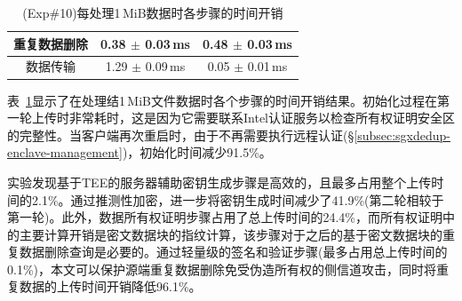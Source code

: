 \begin{table}[!htb]
\begin{tabular}{|c|c|c|c|}
    \multicolumn{2}{|c|}{重复数据删除}            & \multicolumn{1}{c|}{0.38 $\pm$ 0.03\,ms }                         & 0.48 $\pm$ 0.03\,ms                           \\ \hline
    \multicolumn{2}{|c|}{数据传输}                & \multicolumn{1}{c|}{1.29 $\pm$ 0.09\,ms }                         & 0.05 $\pm$ 0.01\,ms                           \\ \hline
  \end{tabular}
  \caption{(Exp\#10)每处理1\,MiB数据时各步骤的时间开销}
  \label{tab:sgxdedup-system-breakdown}
\end{table}

表~\ref{tab:sgxdedup-system-breakdown}显示了在处理结1\,MiB文件数据时各个步骤的时间开销结果。初始化过程在第一轮上传时非常耗时，这是因为它需要联系Intel认证服务以检查所有权证明安全区的完整性。当客户端再次重启时，由于不再需要执行远程认证(\S\ref{subsec:sgxdedup-enclave-management})，初始化时间减少91.5\%。

实验发现基于TEE的服务器辅助密钥生成步骤是高效的，且最多占用整个上传时间的2.1\%。通过推测性加密，\sysnameS 进一步将密钥生成时间减少了41.9\%(第二轮相较于第一轮)。此外，数据所有权证明步骤占用了总上传时间的24.4\%，而所有权证明中的主要计算开销是密文数据块的指纹计算，该步骤对于之后的基于密文数据块的重复数据删除查询是必要的。通过轻量级的签名和验证步骤(最多占用总上传时间的0.1\%)，本文可以保护源端重复数据删除免受伪造所有权的侧信道攻击，同时将重复数据的上传时间开销降低96.1\%。

